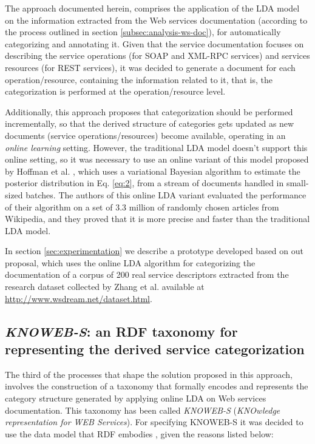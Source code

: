 The approach documented herein, comprises the application of the LDA model on the information extracted from the Web services documentation (according to the process outlined in section \ref{subsec:analysis-ws-doc}), for automatically categorizing and annotating it. Given that the service documentation focuses on describing the service operations (for SOAP and XML-RPC services) and services resources (for REST services), it was decided to generate a document for each operation/resource, containing the information related to it, that is, the categorization is performed at the operation/resource level.

Additionally, this approach proposes that categorization should be performed incrementally, so that the derived structure of categories gets updated as new documents (service operations/resources) become available, operating in an \emph{online learning} setting. However, the traditional LDA model doesn't support this online setting, so it was necessary to use an online variant of this model proposed by Hoffman et al. \cite{Hoffman:2010}, which uses a variational Bayesian algorithm to estimate the posterior distribution in Eq. \ref{eq:2}, from a stream of documents handled in small-sized batches. The authors of this online LDA variant evaluated the performance of their algorithm on a set of 3.3 million of randomly chosen articles from Wikipedia, and they proved that it is more precise and faster than the traditional LDA model.

In section \ref{sec:experimentation} we describe a prototype developed based on out proposal, which uses the online LDA algorithm for categorizing the documentation of a corpus of 200 real service descriptors extracted from the research dataset collected by Zhang et al. \cite{Zhang:2010} available at \href{http://www.wsdream.net/dataset.html}{http://www.wsdream.net/dataset.html}. 

\subsection{\emph{KNOWEB-S}: an RDF taxonomy for representing the derived service categorization}
\label{subsec:KNOWEB-S-RDF}

The third of the processes that shape the solution proposed in this approach, involves the construction of a taxonomy that formally encodes and represents the category structure generated by applying online LDA on Web services documentation. This taxonomy has been called \emph{KNOWEB-S} (\emph{KNOwledge representation for WEB Services}). For specifying KNOWEB-S it was decided to use the data model that RDF embodies \cite{W3C:2004}, given the reasons listed below:


